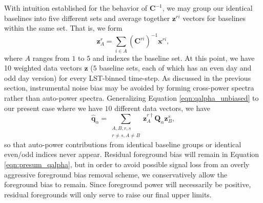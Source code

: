 \documentclass[twocolumn,numberedappendix]{emulateapj} \shorttitle{New Limits on the 21 cm Power Spectrum at $z=8.4$}
\newcommand{\qhat}{\hat{\mathbf{q}}}
\begin{document}
With intuition established for the behavior of $\mathbf{C}^{-1}$, we may group our identical
baselines into five different sets and average together $\mathbf{z}^{ri}$ vectors for baselines
within the same set. That is, we form
\begin{equation}\label{eqn:presum_oqe}
    \mathbf{z}^{r}_{A} = \sum_{i\in{A}} (\mathbf{C}^{ri})^{-1}\mathbf{x}^{ri},
\end{equation}
where $A$ ranges from $1$ to $5$ and indexes the baseline set. At this point,
we have 10 weighted data vectors $\mathbf{z}$ ($5$ baseline sets, each of which has
an even day and odd day version) for every LST-binned time-step. As discussed in the
previous section, instrumental noise bias may be avoided by forming cross-power spectra
rather than auto-power spectra. Generalizing Equation \eqref{eqn:qalpha_unbiased} to our
present case where we have $10$ different data vectors, we have
\begin{equation}\label{eqn:presum_qalpha}
    \qhat_{\alpha} = \sum_{\substack{A,B,r,s\\r\ne{s},A\ne{B}}}\mathbf{z}^{r\dagger}_{A}\mathbf{Q}_{\alpha}\mathbf{z}^{s}_{B},
\end{equation}
so that auto-power contributions from identical baseline groups or identical even/odd indices
never appear. Residual foreground bias will remain in Equation \eqref{eqn:presum_qalpha}, 
but in order to avoid possible signal loss from an overly aggressive foreground bias removal scheme, 
we conservatively allow the foreground bias to remain. Since foreground power will necessarily
be positive, residual foregrounds will only serve to raise our final upper limits.
\end{document}

